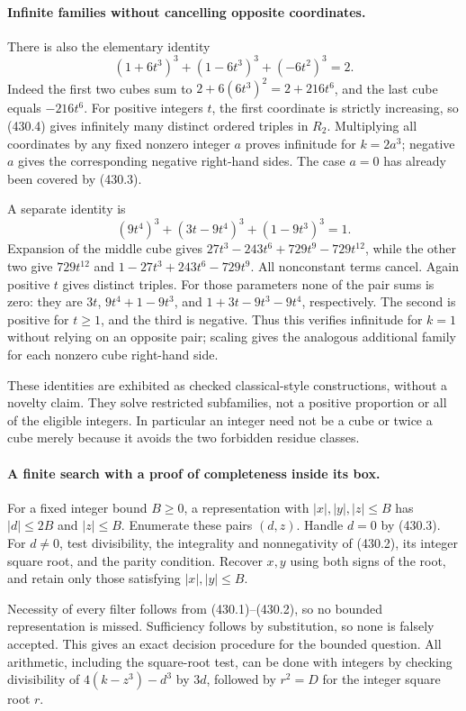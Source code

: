 \documentclass[11pt]{article}
\begin{document}
\paragraph{Infinite families without cancelling opposite coordinates.}
There is also the elementary identity
\[
 (1+6t^3)^3+(1-6t^3)^3+(-6t^2)^3=2. \tag{430.4}
\]
Indeed the first two cubes sum to $2+6(6t^3)^2=2+216t^6$, and the last cube equals $-216t^6$. For positive integers $t$, the first coordinate is strictly increasing, so (430.4) gives infinitely many distinct ordered triples in $R_2$. Multiplying all coordinates by any fixed nonzero integer $a$ proves infinitude for $k=2a^3$; negative $a$ gives the corresponding negative right-hand sides. The case $a=0$ has already been covered by (430.3).

A separate identity is
\[
 (9t^4)^3+(3t-9t^4)^3+(1-9t^3)^3=1. \tag{430.5}
\]
Expansion of the middle cube gives $27t^3-243t^6+729t^9-729t^{12}$, while the other two give $729t^{12}$ and $1-27t^3+243t^6-729t^9$. All nonconstant terms cancel. Again positive $t$ gives distinct triples. For those parameters none of the pair sums is zero: they are $3t$, $9t^4+1-9t^3$, and $1+3t-9t^3-9t^4$, respectively. The second is positive for $t\ge1$, and the third is negative. Thus this verifies infinitude for $k=1$ without relying on an opposite pair; scaling gives the analogous additional family for each nonzero cube right-hand side.

These identities are exhibited as checked classical-style constructions, without a novelty claim. They solve restricted subfamilies, not a positive proportion or all of the eligible integers. In particular an integer need not be a cube or twice a cube merely because it avoids the two forbidden residue classes.

\paragraph{A finite search with a proof of completeness inside its box.}
For a fixed integer bound $B\ge0$, a representation with $|x|,|y|,|z|\le B$ has $|d|\le2B$ and $|z|\le B$. Enumerate these pairs $(d,z)$. Handle $d=0$ by (430.3). For $d\ne0$, test divisibility, the integrality and nonnegativity of (430.2), its integer square root, and the parity condition. Recover $x,y$ using both signs of the root, and retain only those satisfying $|x|,|y|\le B$.

Necessity of every filter follows from (430.1)--(430.2), so no bounded representation is missed. Sufficiency follows by substitution, so none is falsely accepted. This gives an exact decision procedure for the bounded question. All arithmetic, including the square-root test, can be done with integers by checking divisibility of $4(k-z^3)-d^3$ by $3d$, followed by $r^2=D$ for the integer square root $r$.
\end{document}
